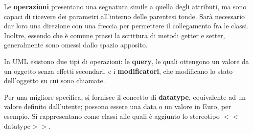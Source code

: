 \noindent Le \textbf{operazioni} presentano una segnatura simile a quella degli attributi, ma sono capaci di ricevere dei parametri all'interno delle
parentesi tonde. Sarà necessario dar loro una direzione con una freccia per permettere il collegamento fra le classi. Inoltre, essendo che è
comune prassi la scrittura di metodi getter e setter, generalmente sono omessi dallo spazio apposito.\par
In UML esistono due tipi di operazioni: le \textbf{query}, le quali ottengono un valore da un oggetto senza effetti secondari, e i \textbf{modificatori},
che modificano lo stato dell'oggetto su cui sono chiamate.\par
Per una migliore specifica, si fornisce il concetto di \textbf{datatype}, equivalente ad un valore definito dall'utente; possono essere una data o un
valore in Euro, per esempio. Si rappresentano come classi alle quali è aggiunto lo stereotipo $<<$datatype$>>$.\newline

